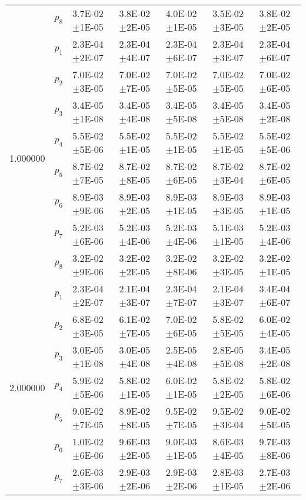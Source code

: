 \begin{tabular}{lllllll}
 & $p_8$ & 3.7E-02\(\pm\)1E-05 & 3.8E-02\(\pm\)2E-05 & 4.0E-02\(\pm\)1E-05 & 3.5E-02\(\pm\)3E-05 & 3.8E-02\(\pm\)2E-05 \\
\multirow[c]{8}{*}{1.000000} & $p_1$ & 2.3E-04\(\pm\)2E-07 & 2.3E-04\(\pm\)4E-07 & 2.3E-04\(\pm\)6E-07 & 2.3E-04\(\pm\)3E-07 & 2.3E-04\(\pm\)6E-07 \\
 & $p_2$ & 7.0E-02\(\pm\)3E-05 & 7.0E-02\(\pm\)7E-05 & 7.0E-02\(\pm\)5E-05 & 7.0E-02\(\pm\)5E-05 & 7.0E-02\(\pm\)6E-05 \\
 & $p_3$ & 3.4E-05\(\pm\)1E-08 & 3.4E-05\(\pm\)4E-08 & 3.4E-05\(\pm\)5E-08 & 3.4E-05\(\pm\)5E-08 & 3.4E-05\(\pm\)2E-08 \\
 & $p_4$ & 5.5E-02\(\pm\)5E-06 & 5.5E-02\(\pm\)1E-05 & 5.5E-02\(\pm\)1E-05 & 5.5E-02\(\pm\)1E-05 & 5.5E-02\(\pm\)5E-06 \\
 & $p_5$ & 8.7E-02\(\pm\)7E-05 & 8.7E-02\(\pm\)8E-05 & 8.7E-02\(\pm\)6E-05 & 8.7E-02\(\pm\)3E-04 & 8.7E-02\(\pm\)6E-05 \\
 & $p_6$ & 8.9E-03\(\pm\)9E-06 & 8.9E-03\(\pm\)2E-05 & 8.9E-03\(\pm\)1E-05 & 8.9E-03\(\pm\)3E-05 & 8.9E-03\(\pm\)1E-05 \\
 & $p_7$ & 5.2E-03\(\pm\)6E-06 & 5.2E-03\(\pm\)4E-06 & 5.2E-03\(\pm\)4E-06 & 5.1E-03\(\pm\)1E-05 & 5.2E-03\(\pm\)4E-06 \\
 & $p_8$ & 3.2E-02\(\pm\)9E-06 & 3.2E-02\(\pm\)2E-05 & 3.2E-02\(\pm\)8E-06 & 3.2E-02\(\pm\)3E-05 & 3.2E-02\(\pm\)1E-05 \\
\multirow[c]{8}{*}{2.000000} & $p_1$ & 2.3E-04\(\pm\)2E-07 & 2.1E-04\(\pm\)3E-07 & 2.3E-04\(\pm\)7E-07 & 2.1E-04\(\pm\)3E-07 & 3.4E-04\(\pm\)6E-07 \\
 & $p_2$ & 6.8E-02\(\pm\)3E-05 & 6.1E-02\(\pm\)7E-05 & 7.0E-02\(\pm\)6E-05 & 5.8E-02\(\pm\)5E-05 & 6.0E-02\(\pm\)4E-05 \\
 & $p_3$ & 3.0E-05\(\pm\)1E-08 & 3.0E-05\(\pm\)4E-08 & 2.5E-05\(\pm\)4E-08 & 2.8E-05\(\pm\)5E-08 & 3.4E-05\(\pm\)2E-08 \\
 & $p_4$ & 5.9E-02\(\pm\)5E-06 & 5.8E-02\(\pm\)1E-05 & 6.0E-02\(\pm\)1E-05 & 5.8E-02\(\pm\)2E-05 & 5.8E-02\(\pm\)6E-06 \\
 & $p_5$ & 9.0E-02\(\pm\)7E-05 & 8.9E-02\(\pm\)8E-05 & 9.5E-02\(\pm\)7E-05 & 9.5E-02\(\pm\)3E-04 & 9.0E-02\(\pm\)5E-05 \\
 & $p_6$ & 1.0E-02\(\pm\)6E-06 & 9.6E-03\(\pm\)2E-05 & 9.0E-03\(\pm\)1E-05 & 8.6E-03\(\pm\)4E-05 & 9.7E-03\(\pm\)8E-06 \\
 & $p_7$ & 2.6E-03\(\pm\)3E-06 & 2.9E-03\(\pm\)2E-06 & 2.9E-03\(\pm\)2E-06 & 2.8E-03\(\pm\)1E-05 & 2.7E-03\(\pm\)2E-06 \\

\end{tabular}
